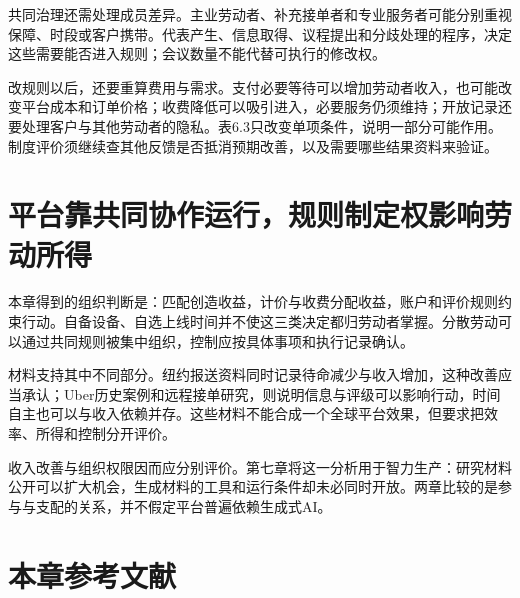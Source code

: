 \documentclass[UTF8,fontset=windows,12pt,a4paper,oneside,openany]{ctexbook}
\begin{document}
共同治理还需处理成员差异。主业劳动者、补充接单者和专业服务者可能分别重视保障、时段或客户携带。代表产生、信息取得、议程提出和分歧处理的程序，决定这些需要能否进入规则；会议数量不能代替可执行的修改权。

改规则以后，还要重算费用与需求。支付必要等待可以增加劳动者收入，也可能改变平台成本和订单价格；收费降低可以吸引进入，必要服务仍须维持；开放记录还要处理客户与其他劳动者的隐私。表6.3只改变单项条件，说明一部分可能作用。制度评价须继续查其他反馈是否抵消预期改善，以及需要哪些结果资料来验证。

\section{平台靠共同协作运行，规则制定权影响劳动所得}

本章得到的组织判断是：匹配创造收益，计价与收费分配收益，账户和评价规则约束行动。自备设备、自选上线时间并不使这三类决定都归劳动者掌握。分散劳动可以通过共同规则被集中组织，控制应按具体事项和执行记录确认。

材料支持其中不同部分。纽约报送资料同时记录待命减少与收入增加，这种改善应当承认；Uber历史案例和远程接单研究，则说明信息与评级可以影响行动，时间自主也可以与收入依赖并存。这些材料不能合成一个全球平台效果，但要求把效率、所得和控制分开评价。



收入改善与组织权限因而应分别评价。第七章将这一分析用于智力生产：研究材料公开可以扩大机会，生成材料的工具和运行条件却未必同时开放。两章比较的是参与与支配的关系，并不假定平台普遍依赖生成式AI。

\section*{本章参考文献}
\end{document}
